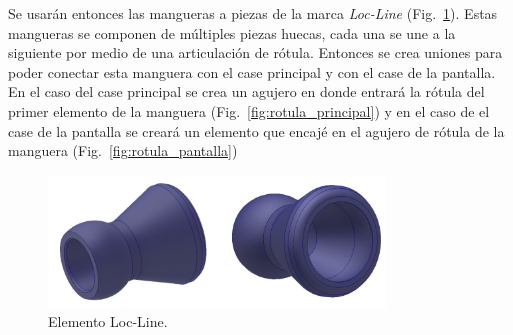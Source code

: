 Se usarán entonces las mangueras a piezas de la marca \textit{Loc-Line} (Fig.~\ref{fig:brazo_1}). Estas mangueras se componen de múltiples piezas huecas, cada una se une a la siguiente por medio de una articulación de rótula. Entonces se crea uniones para poder conectar esta manguera con el case principal y con el case de la pantalla. En el caso del case principal se crea un agujero en donde entrará la rótula del primer elemento de la manguera (Fig.~\ref{fig:rotula_principal}) y en el caso de el case de la pantalla se creará un elemento que encajé en el agujero de rótula de la manguera (Fig.~\ref{fig:rotula_pantalla})


\begin{figure}[hbt!]
\centering
\includegraphics[width=0.8\textwidth]{brazo_1.pdf}
\caption{Elemento Loc-Line.}
\label{fig:brazo_1}
\end{figure}


